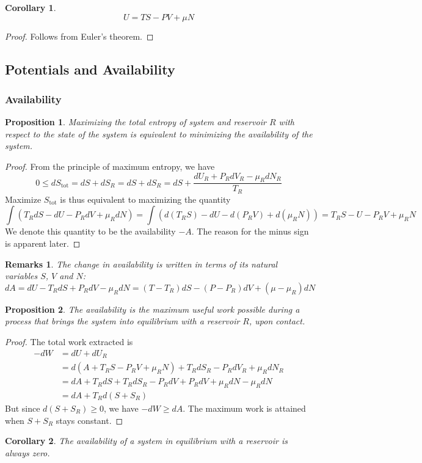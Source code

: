 \documentclass[a4paper]{article}
\newtheorem{remarks}{Remarks}[section]
\theoremstyle{new}
\newtheorem{prop}{Proposition}[section]
\newtheorem{cor}{Corollary}[section]
\begin{document}
\begin{cor}
$$U=TS-PV+\mu N$$
\end{cor}
\begin{proof}
Follows from Euler's theorem.
\end{proof}
\subsection{Potentials and Availability}
\subsubsection*{Availability}
\begin{prop}
Maximizing the total entropy of system and reservoir $R$ with respect to the state of the system is equivalent to minimizing the availability of the system.
\end{prop}
\begin{proof}
From the principle of maximum entropy, we have
$$0\leq dS_{\text{tot}}=dS+dS_R=dS+dS_R=dS+\frac{dU_R+P_RdV_R-\mu_RdN_R}{T_R}$$
Maximize $S_{\text{tot}}$ is thus equivalent to maximizing the quantity
$$\int(T_RdS-dU-P_RdV+\mu_RdN)=\int(d(T_RS)-dU-d(P_RV)+d(\mu_RN))=T_RS-U-P_RV+\mu_RN$$
We denote this quantity to be the availability $-A$. The reason for the minus sign is apparent later.
\end{proof}
\begin{remarks}
The change in availability is written in terms of its natural variables $S$, $V$ and $N$:
$$dA=dU-T_RdS+P_RdV-\mu_RdN=(T-T_R)dS-(P-P_R)dV+(\mu-\mu_R)dN$$
\end{remarks}
\begin{prop}
The availability is the maximum useful work possible during a process that brings the system into equilibrium with a reservoir $R$, upon contact.
\end{prop}
\begin{proof}
The total work extracted is
\begin{align}
-dW&=dU+dU_R\nonumber\\&=d(A+T_RS-P_RV+\mu_RN)+T_RdS_R-P_RdV_R+\mu_RdN_R\nonumber\\&=dA+T_RdS+T_RdS_R-P_RdV+P_RdV+\mu_RdN-\mu_RdN\nonumber\\&=dA+T_Rd(S+S_R)\nonumber
\end{align}
But since $d(S+S_R)\geq0$, we have $-dW\geq dA$. The maximum work is attained when $S+S_R$ stays constant.
\end{proof}
\begin{cor}
The availability of a system in equilibrium with a reservoir is always zero.
\end{cor}
\end{document}
